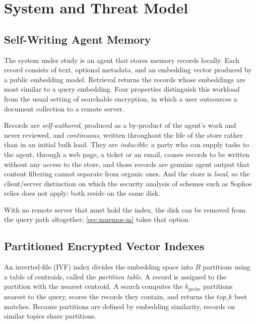 \section{System and Threat Model}
\label{sec:threat}

\subsection{Self-Writing Agent Memory}

The system under study is an agent that stores memory records locally. Each record consists of
text, optional metadata, and an embedding vector produced by a public embedding model. Retrieval
returns the records whose embeddings are most similar to a query embedding. Four properties
distinguish this workload from the usual setting of searchable encryption, in which a user
outsources a document collection to a remote server.

Records are \emph{self-authored}, produced as a by-product of the agent's work and never reviewed,
and \emph{continuous}, written throughout the life of the store rather than in an initial bulk load.
They are \emph{inducible}: a party who can supply tasks to the agent, through a web page, a ticket
or an email, causes records to be written without any access to the store, and those records are
genuine agent output that content filtering cannot separate from organic ones. And the store is
\emph{local}, so the client/server distinction on which the security analysis of schemes such as
Sophos \cite{bost2016sophos} relies does not apply: both reside on the same disk.

With no remote server that must hold the index, the disk can be removed from the query path
altogether; \cref{sec:mnemos-m} takes that option.

\subsection{Partitioned Encrypted Vector Indexes}

An inverted-file (IVF) index divides the embedding space into $B$ partitions using a table of
centroids, called the \emph{partition table}. A record is assigned to the partition with the
nearest centroid. A search computes the $k_{\mathrm{probe}}$ partitions nearest to the query,
scores the records they contain, and returns the $\mathit{top\_k}$ best matches. Because
partitions are defined by embedding similarity, records on similar topics share partitions.

